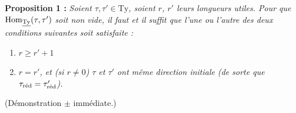 \textbf{Proposition 1 :} \textit{Soient $\tau,\tau'\in\mathrm{Ty}$, soient $r$, $r'$ leurs longueurs utiles. Pour que $\mathrm{Hom}_{\underline{\mathrm{Ty}}}(\tau,\tau')$ soit non vide, il faut et il suffit que l'une ou l'autre des deux conditions suivantes soit satisfaite :}

\begin{enumerate}[label={}, leftmargin=*]
\item[\textit{a)}] $r\geq r'+1$


\item[\textit{b)}] \textit{$r=r'$, et (si $r\neq0$) $\tau$ et $\tau'$ ont même direction initiale (de sorte que $\tau_{\mathrm{r\acute{e}d}}=\tau'_{\mathrm{r\acute{e}d}}$).}
\end{enumerate}

(Démonstration $\pm$ immédiate.)

